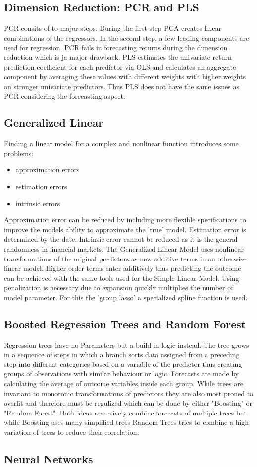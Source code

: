 \documentclass{article}
\begin{document}
\subsection{Dimension Reduction: PCR and PLS}
	PCR consits of to major steps. During the first step PCA creates linear combinations
	of the regressors. In the second step, a few leading components are used for regression.
	PCR fails in forecasting returns during the dimension reduction which is ja major drawback.
	PLS estimates the univariate return prediction coefficient for each predictor via OLS
	and calculates an aggregate component by averaging these values with different weights
	with higher weights on stronger univariate predictors. Thus PLS does not have the
	same issues as PCR considering the forecasting aspect.

\subsection{Generalized Linear}
	Finding a linear model for a complex and nonlinear function introduces some problems:
	\begin{itemize}
		\item approximation errors
		\item estimation errors
		\item intrinsic errors
	\end{itemize}
	Approximation error can be reduced by including more flexible specifications to improve the 
	models ability to approximate the 'true' model.
	Estimation error is determined by the date.
	Intrinsic error cannot be reduced as it is the general randomness in financial markets.
	The Generalized Linear Model uses nonlinear transformations of the original predictors as new
	additive terms in an otherwise linear model.
	Higher order terms enter additively thus predicting the outcome can be achieved with the same
	tools used for the Simple Linear Model.
	Using penalization is necessary due to expansion quickly multiplies the number of model parameter.
	For this the 'group lasso' a specialized spline function is used.
	
\subsection{Boosted Regression Trees and Random Forest}
	Regression trees have no Parameters but a build in logic instead.
	The tree grows in a sequence of steps in which a branch sorts data assigned from
	a preceding step into different categories based on a variable of the predictor
	thus creating groups of observations with similar behaviour or logic.
	Forecasts are made by calculating the average of outcome variables inside each group.
	While trees are invariant to monotonic transformations of predictors they are
	also most proned to overfit and therefore must be regulized which can be done
	by either "Boosting" or "Random Forest". Both ideas recursively combine
	forecasts of multiple trees but while Boosting uses many simplified trees
	Random Trees tries to combine a high variation of trees to reduce their correlation.

\subsection{Neural Networks}
\end{document}

